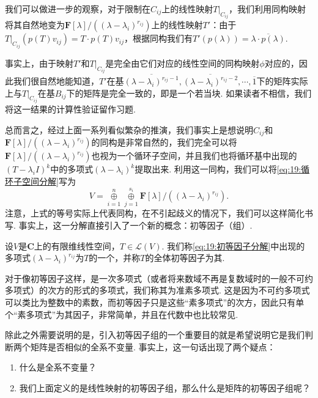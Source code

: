 我们可以做进一步的观察，对于限制在$C_{ij}$上的线性映射$T|_{C_{ij}}$，我们利用同构映射将其自然地变为$\mathbf{F}[\lambda]/((\lambda-\lambda_i)^{r_{ij}})$上的线性映射$T'$：由于$T|_{C_{ij}}(p(T)v_{ij})=T\cdot p(T)v_{ij}$，根据同构我们有$T'(p(\lambda))=\overline{\lambda\cdot p(\lambda)}$.

事实上，由于映射$T'$和$T|_{C_{ij}}$是完全由它们对应的线性空间的同构映射$\phi$对应的，因此我们很自然地能知道，$T'$在基$\overline{(\lambda-\lambda_i)^{r_{ij}-1}},\overline{(\lambda-\lambda_i)^{r_{ij}-2}},\cdots,\overline{1}$下的矩阵实际上与$T|_{C_{ij}}$在基$B_{ij}$下的矩阵是完全一致的，即是一个若当块. 如果读者不相信，我们将这一结果的计算性验证留作习题.

总而言之，经过上面一系列看似繁杂的推演，我们事实上是想说明$C_{ij}$和$\mathbf{F}[\lambda]/((\lambda-\lambda_i)^{r_{ij}})$的同构是非常自然的，我们完全可以将$\mathbf{F}[\lambda]/((\lambda-\lambda_i)^{r_{ij}})$也视为一个循环子空间，并且我们也将循环基中出现的$(T-\lambda_i I)^k$中的多项式$(\lambda-\lambda_i)^k$提取出来. 利用这一同构，我们可以将\autoref{eq:19:循环子空间分解}写为
\begin{equation} \label{eq:19:初等因子分解}
    V=\mathop{\oplus}\limits_{i=1}^n\mathop{\oplus}\limits_{j=1}^{s_i} \mathbf{F}[\lambda]/((\lambda-\lambda_i)^{r_{ij}}).
\end{equation}
注意，上式的等号实际上代表同构，在不引起歧义的情况下，我们可以这样简化书写. 事实上，这一分解直接引入了一个新的概念：初等因子（组）.
\begin{definition}
    设$V$是$\mathbf{C}$上的有限维线性空间，$T\in\mathcal{L}(V)$. 我们称\autoref{eq:19:初等因子分解}中出现的多项式$(\lambda-\lambda_i)^{r_{ij}}$为$T$的一个，并称$T$的全体初等因子为其.
\end{definition}

对于像初等因子这样，是一次多项式（或者将来数域不再是复数域时的一般不可约多项式）的次方的形式的多项式，我们称其为准素多项式. 这是因为不可约多项式可以类比为整数中的素数，而初等因子只是这些``素多项式''的次方，因此只有单个``素多项式''为其因子，非常简单，并且在代数中也比较常见.

除此之外需要说明的是，引入初等因子组的一个重要目的就是希望说明它是我们判断两个矩阵是否相似的全系不变量. 事实上，这一句话出现了两个疑点：
\begin{enumerate}
    \item 什么是全系不变量？
    \item 我们上面定义的是线性映射的初等因子组，那么什么是矩阵的初等因子组呢？
\end{enumerate}

